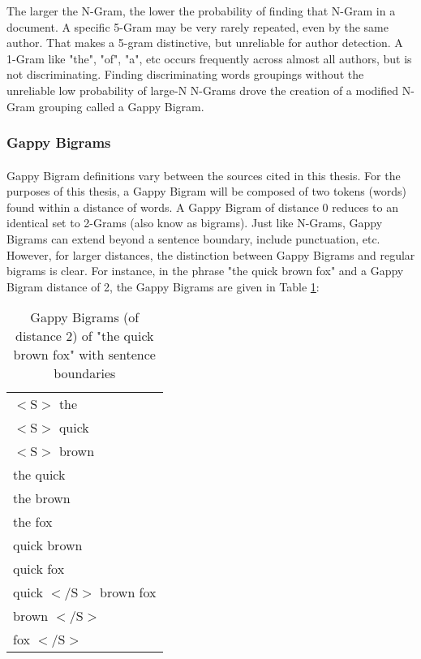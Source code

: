 		The larger the N-Gram, the lower the probability of finding that N-Gram in a document.  A specific 5-Gram may be very rarely repeated, even by the same author.  That makes a 5-gram distinctive, but unreliable for author detection.  A 1-Gram like "the", "of", "a", etc occurs frequently across almost all authors, but is not discriminating.  Finding discriminating words groupings without the unreliable low probability of large-N N-Grams drove the creation of a modified N-Gram grouping called a Gappy Bigram.

	\subsubsection{Gappy Bigrams}
		\paragraph{} Gappy Bigram definitions vary between the sources cited in this thesis.  For the purposes of this thesis, a Gappy Bigram will be composed of two tokens (words) found within a distance of words.  A Gappy Bigram of distance 0 reduces to an identical set to 2-Grams (also know as bigrams). Just like N-Grams, Gappy Bigrams can extend beyond a sentence boundary, include punctuation, etc. However, for larger distances, the distinction between Gappy Bigrams and regular bigrams is clear. For instance, in the phrase "the quick brown fox" and a Gappy Bigram distance of 2, the Gappy Bigrams are given in Table \ref{table:2gappybigrams}:
		\begin{center}
			\begin{table}[h]
			\caption{Gappy Bigrams (of distance 2) of "the quick brown fox" with sentence boundaries}
			\label{table:2gappybigrams}
				\begin{center}
					\begin{tabular}{l}
					$<\text{S}>$ the\\
					$<\text{S}>$ quick\\
					$<\text{S}>$ brown\\
					the quick\\
					the brown\\
					the fox\\
					quick brown\\
					quick fox\\
					quick $<\text{/S}>$
					brown fox\\
					brown $<\text{/S}>$\\
					fox $<\text{/S}>$\\
					\end{tabular}
				\end{center}
			\end{table}
		\end{center}
		
